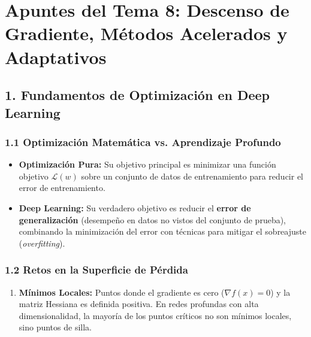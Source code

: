 \documentclass[11pt,oneside]{article}
\begin{document}
\tableofcontents
\clearpage
{}
\section{Apuntes del Tema 8: Descenso de Gradiente, Métodos Acelerados y Adaptativos}

\subsection{1. Fundamentos de Optimización en Deep Learning}

\subsubsection{1.1 Optimización Matemática vs. Aprendizaje Profundo}

\begin{itemize}

\item \textbf{Optimización Pura:} Su objetivo principal es minimizar una función objetivo \(\mathcal{L}(w)\) sobre un conjunto de datos de entrenamiento para reducir el error de entrenamiento.

\end{itemize}

\begin{itemize}

\item \textbf{Deep Learning:} Su verdadero objetivo es reducir el \textbf{error de generalización} (desempeño en datos no vistos del conjunto de prueba), combinando la minimización del error con técnicas para mitigar el sobreajuste (\emph{overfitting}).

\end{itemize}

\subsubsection{1.2 Retos en la Superficie de Pérdida}

\begin{enumerate}

\item \textbf{Mínimos Locales:} Puntos donde el gradiente es cero (\(\nabla f(x) = 0\)) y la matriz Hessiana es definida positiva. En redes profundas con alta dimensionalidad, la mayoría de los puntos críticos no son mínimos locales, sino puntos de silla.

\end{enumerate}
\end{document}
